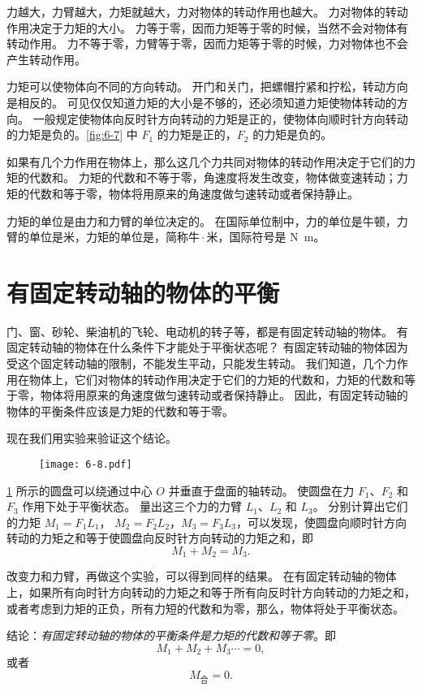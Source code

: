 力越大，力臂越大，力矩就越大，力对物体的转动作用也越大。
力对物体的转动作用决定于力矩的大小。
力等于零，因而力矩等于零的时候，当然不会对物体有转动作用。
力不等于零，力臂等于零，因而力矩等于零的时候，力对物体也不会产生转动作用。

力矩可以使物体向不同的方向转动。
开门和关门，把螺帽拧紧和拧松，转动方向是相反的。
可见仅仅知道力矩的大小是不够的，还必须知道力矩使物体转动的方向。
一般规定使物体向反时针方向转动的力矩是正的，使物体向顺时针方向转动的力矩是负的。\cref{fig:6-7} 中 $F_1$ 的力矩是正的，$F_2$ 的力矩是负的。

如果有几个力作用在物体上，那么这几个力共同对物体的转动作用决定于它们的力矩的代数和。
力矩的代数和不等于零，角速度将发生改变，物体做变速转动；力矩的代数和等于零，物体将用原来的角速度做匀速转动或者保持静止。

力矩的单位是由力和力臂的单位决定的。
在国际单位制中，力的单位是牛顿，力臂的单位是米，力矩的单位是，简称牛\,$\cdot$\,米，国际符号是 \unit{N.m}。

\section{有固定转动轴的物体的平衡}
门、窗、砂轮、柴油机的飞轮、电动机的转子等，都是有固定转动轴的物体。
有固定转动轴的物体在什么条件下才能处于平衡状态呢？
有固定转动轴的物体因为受这个固定转动轴的限制，不能发生平动，只能发生转动。
我们知道，几个力作用在物体上，它们对物体的转动作用决定于它们的力矩的代数和，力矩的代数和等于零，物体将用原来的角速度做匀速转动或者保持静止。
因此，有固定转动轴的物体的平衡条件应该是力矩的代数和等于零。

现在我们用实验来验证这个结论。
\begin{figure}
  \texttt{[image: 6-8.pdf]}
  \caption{}\label{fig:6-8}
\end{figure}

\cref{fig:6-8} 所示的圆盘可以绕通过中心 $O$ 并垂直于盘面的轴转动。
使圆盘在力 $F_1$、$F_2$ 和 $F_3$ 作用下处于平衡状态。
量出这三个力的力臂 $L_1$、$L_2$ 和 $L_3$。
分别计算出它们的力矩 $M_1 =F_1 L_1$， $M_2 =F_2 L_2$，$M_3 =F_3 L_3$，可以发现，使圆盘向顺时针方向转动的力矩之和等于使圆盘向反时针方向转动的力矩之和，即
\[M_1+M_2=M_3.\]

改变力和力臂，再做这个实验，可以得到同样的结果。
在有固定转动轴的物体上，如果所有向时针方向转动的力矩之和等于所有向反时针方向转动的力矩之和，或者考虑到力矩的正负，所有力短的代数和为零，那么，物体将处于平衡状态。

结论：\emph{有固定转动轴的物体的平衡条件是力矩的代数和等于零}。即
\[M_1+M_2+M_3\cdots=0, \]
或者
\[M_{\text{合}}=0.\]

